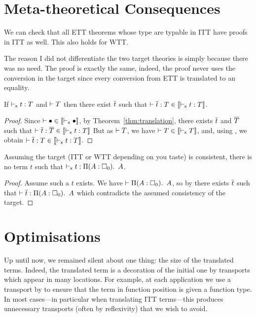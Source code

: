 \section{Meta-theoretical Consequences}

We can check that all \acrshort{ETT} theorems whose type are typable in
\acrshort{ITT} have proofs in \acrshort{ITT} as well.
This also holds for \acrshort{WTT}.

The reason I did not differentiate the two target theories is simply because
there was no need. The proof is exactly the same, indeed, the proof never uses
the conversion in the target since every conversion from \acrshort{ETT} is
translated to an equality.

\begin{corollary}[Conservativity]
  If $\vdash_{\mathsf{x}} t : T$ and $\vdash T$ then there exist $\overline{t}$ such that
    $\vdash \overline{t} : T \in \llbracket \vdash_{\mathsf{x}} t : T \rrbracket$.
\end{corollary}

\begin{proof}
  Since $\vdash \bullet \in \llbracket \vdash_{\mathsf{x}} \bullet \rrbracket$, by
  Theorem~\eqref{thm:translation}, there exists $\overline{t}$ and $\overline{T}$ such
  that
  $\vdash \overline{t} : \overline{T} \in \llbracket \vdash_{\mathsf{x}} t : T \rrbracket$
  But as $\vdash T$, we have
  $\vdash T \in \llbracket \vdash_{\mathsf{x}} T \rrbracket$, and,
  using , we obtain
  $\vdash \overline{t} : T \in \llbracket \vdash_{\mathsf{x}} t : T \rrbracket$.
\end{proof}

\begin{corollary}
  Assuming the target (\acrshort{ITT} or \acrshort{WTT} depending on you taste)
  is consistent, there is no term $t$ such that
  $\vdash_{\mathsf{x}} t : \mathop{\Pi(A:\square_{0}).\ }{A}$.
\end{corollary}

\begin{proof}
  Assume such a $t$ exists.
  We have $\vdash \mathop{\Pi(A:\square_{0}).\ }{A}$, so by 
  there exists $\overline{t}$ such that $\vdash \overline{t} : \mathop{\Pi(A:\square_{0}).\ }{A}$ which
  contradicts the assumed consistency of the target.
\end{proof}

\section{Optimisations}

Up until now, we remained silent about one thing: the size of the
translated terms. Indeed, the translated term is a decoration of the
initial one by transports which appear in many locations. For example,
at each application we use a transport by  to
ensure that the term in function position is given a function type. In
most cases---in particular when translating ITT terms---this produces
unnecessary transports (often by reflexivity) that we wish to avoid.

